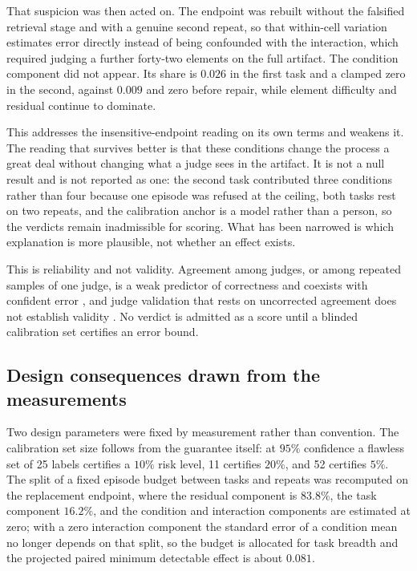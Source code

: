 \documentclass[11pt,a4paper]{article}
\begin{document}
That suspicion was then acted on. The endpoint was rebuilt without the falsified retrieval
stage and with a genuine second repeat, so that within-cell variation estimates error
directly instead of being confounded with the interaction, which required judging a further
forty-two elements on the full artifact. The condition component did not appear. Its share
is $0.026$ in the first task and a clamped zero in the second, against $0.009$ and zero
before repair, while element difficulty and residual continue to dominate.

This addresses the insensitive-endpoint reading on its own terms and weakens it. The
reading that survives better is that these conditions change the process a great deal
without changing what a judge sees in the artifact. It is not a null result and is not
reported as one: the second task contributed three conditions rather than four because one
episode was refused at the ceiling, both tasks rest on two repeats, and the calibration anchor is a model rather than a person, so the verdicts remain inadmissible for scoring. What has been narrowed
is which explanation is more plausible, not whether an effect exists.

This is reliability and not validity.  Agreement among judges, or among repeated
samples of one judge, is a weak predictor of correctness and coexists with
confident error \citep{agreementaudit2026}, and judge validation that rests on
uncorrected agreement does not establish validity \citep{reliabilitywithoutvalidity2026}.
No verdict is admitted as a score until a blinded calibration set certifies an error bound.

\subsection{Design consequences drawn from the measurements}

Two design parameters were fixed by measurement rather than convention.  The
calibration set size follows from the guarantee itself: at $95\%$ confidence a
flawless set of 25 labels certifies a $10\%$ risk level, 11 certifies $20\%$, and
52 certifies $5\%$.  The split of a fixed episode budget between tasks and
repeats was recomputed on the replacement endpoint, where the residual component
is $83.8\%$, the task component $16.2\%$, and the condition and interaction
components are estimated at zero; with a zero interaction component the standard
error of a condition mean no longer depends on that split, so the budget is
allocated for task breadth and the projected paired minimum detectable effect is
about $0.081$.
\end{document}

